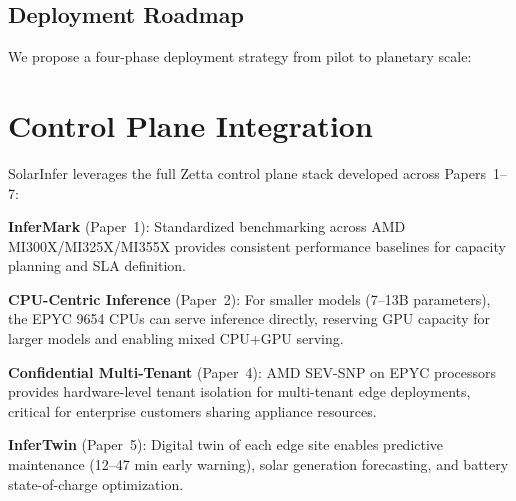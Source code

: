 \documentclass[conference,10pt,letterpaper]{IEEEtran}
\begin{document}
\subsection{Deployment Roadmap}

We propose a four-phase deployment strategy from pilot to planetary scale:

\begin{table}[!t]
\caption{Deployment Roadmap}
\label{tab:roadmap}
\centering\scriptsize
{}
\end{table}

\section{Control Plane Integration}
\label{sec:controlplane}

SolarInfer leverages the full Zetta control plane stack developed across Papers~1--7:

\textbf{InferMark} (Paper~1): Standardized benchmarking across AMD MI300X/MI325X/MI355X provides consistent performance baselines for capacity planning and SLA definition.

\textbf{CPU-Centric Inference} (Paper~2): For smaller models (7--13B parameters), the EPYC 9654 CPUs can serve inference directly, reserving GPU capacity for larger models and enabling mixed CPU+GPU serving.

\textbf{Confidential Multi-Tenant} (Paper~4): AMD SEV-SNP on EPYC processors provides hardware-level tenant isolation for multi-tenant edge deployments, critical for enterprise customers sharing appliance resources.

\textbf{InferTwin} (Paper~5): Digital twin of each edge site enables predictive maintenance (12--47 min early warning), solar generation forecasting, and battery state-of-charge optimization.
\end{document}
